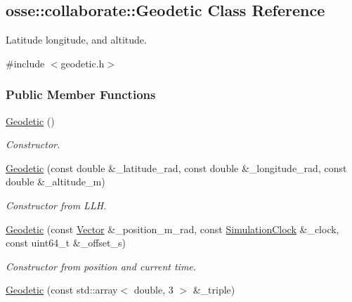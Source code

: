\hypertarget{classosse_1_1collaborate_1_1_geodetic}{}\subsection{osse\+:\+:collaborate\+:\+:Geodetic Class Reference}
\label{classosse_1_1collaborate_1_1_geodetic}


Latitude longitude, and altitude.  




{\ttfamily \#include $<$geodetic.\+h$>$}

\subsubsection*{Public Member Functions}
\begin{DoxyCompactItemize}
\item 
\mbox{\label{classosse_1_1collaborate_1_1_geodetic_a8c111a79dfe50da43aa21f6256ffa13c}} 
\hyperlink{classosse_1_1collaborate_1_1_geodetic_a8c111a79dfe50da43aa21f6256ffa13c}{Geodetic} ()
\begin{DoxyCompactList}\small\item\em Constructor. \end{DoxyCompactList}\item 
\hyperlink{classosse_1_1collaborate_1_1_geodetic_ac9d280c2db61a43f05581513d33ed592}{Geodetic} (const double \&\+\_\+latitude\+\_\+rad, const double \&\+\_\+longitude\+\_\+rad, const double \&\+\_\+altitude\+\_\+m)
\begin{DoxyCompactList}\small\item\em Constructor from L\+LH. \end{DoxyCompactList}\item 
\hyperlink{classosse_1_1collaborate_1_1_geodetic_a70cc660ec75b0240b495343744a43c8b}{Geodetic} (const \hyperlink{classosse_1_1collaborate_1_1_vector}{Vector} \&\+\_\+position\+\_\+m\+\_\+rad, const \hyperlink{classosse_1_1collaborate_1_1_simulation_clock}{Simulation\+Clock} \&\+\_\+clock, const uint64\+\_\+t \&\+\_\+offset\+\_\+s)
\begin{DoxyCompactList}\small\item\em Constructor from position and current time. \end{DoxyCompactList}\item 
\hyperlink{classosse_1_1collaborate_1_1_geodetic_a053690869f985a7561abdfaa7eb9e8a7}{Geodetic} (const std\+::array$<$ double, 3 $>$ \&\+\_\+triple)

\end{DoxyCompactItemize}
